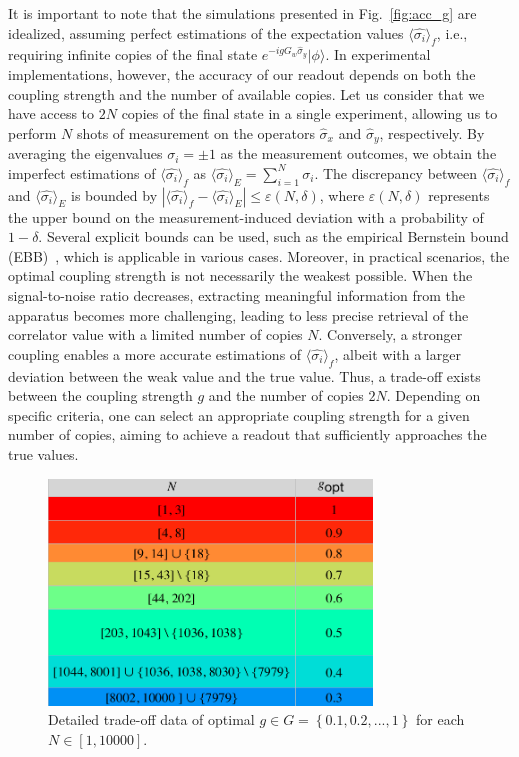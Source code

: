 \documentclass[twocolumn,pra,aps,superscriptaddress]{revtex4-2}
\begin{document}
It is important to note that the simulations presented in Fig.~\ref{fig:acc_g} are idealized, assuming perfect estimations of the expectation values $\langle\hat{\sigma_i}\rangle_f$, i.e.,  requiring infinite copies of the final state $e^{-igG_w\hat{\sigma}_{y}} |\phi\rangle$. In experimental implementations, however, the accuracy of our readout depends on both the coupling strength and the number of available copies. Let us consider that we have access to $2N$ copies of the final state in a single experiment, allowing us to perform $N$ shots of measurement on the operators $\hat{\sigma}_x$ and $\hat{\sigma}_y$, respectively. By averaging the eigenvalues $ \sigma_i =\pm1$ as the measurement outcomes, we obtain the imperfect estimations of $\langle\hat{\sigma_i}\rangle_f$ as $\langle\hat{\sigma_i}\rangle_E=\sum_{i=1}^N \sigma_i $. The discrepancy between $\langle\hat{\sigma_i}\rangle_f$ and $\langle\hat{\sigma_i}\rangle_E$ is bounded by $|\langle\hat{\sigma_i}\rangle_f-\langle\hat{\sigma_i}\rangle_E|\leq\varepsilon(N,\delta)$, where $\varepsilon(N,\delta)$ represents the upper bound on the measurement-induced deviation with a probability of $1-\delta$. Several explicit bounds can be used, such as the empirical Bernstein bound (EBB)~\cite{bernstein}, which is applicable in various cases. Moreover, in practical scenarios, the optimal coupling strength is not necessarily the weakest possible. When the signal-to-noise ratio decreases, extracting meaningful information from the apparatus becomes more challenging, leading to less precise retrieval of the correlator value with a limited number of copies $N$. Conversely, a stronger coupling enables a more accurate estimations of $\langle\hat{\sigma_i}\rangle_f$, albeit with a larger deviation between the weak value and the true value. Thus, a trade-off exists between the coupling strength $g$ and the number of copies $2N$. Depending on specific criteria, one can select an appropriate coupling strength for a given number of copies, aiming to achieve a readout that sufficiently approaches the true values.


\begin{figure}
\includegraphics[width=8.6cm]{Fig3}
\caption{\label{Detailed trade-off data} Detailed trade-off data of optimal $g\in G=\left\{0.1, 0.2, ..., 1\right\}$ for each $N\in\left[1,10000\right]$.}
\end{figure}
\end{document}
